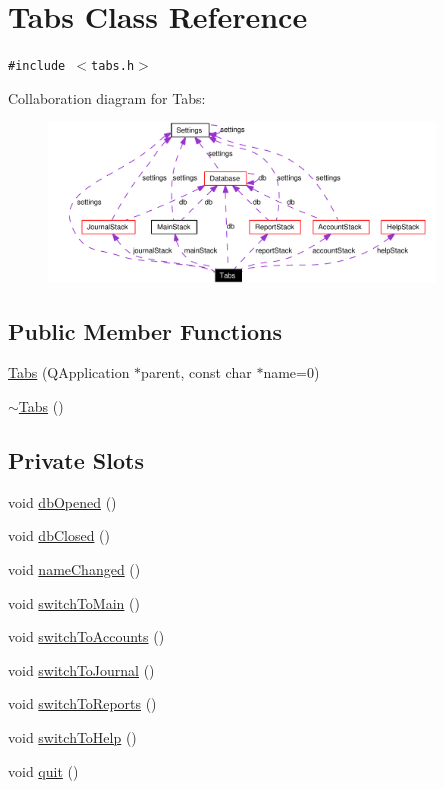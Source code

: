 \hypertarget{classTabs}{
\section{Tabs Class Reference}
\label{classTabs}
}
{\tt \#include $<$tabs.h$>$}

Collaboration diagram for Tabs:\begin{figure}[H]
\begin{center}
\leavevmode
\includegraphics[width=291pt]{classTabs__coll__graph}
\end{center}
\end{figure}
\subsection*{Public Member Functions}
\begin{CompactItemize}
\item 
\hyperlink{classTabs_a0}{Tabs} (QApplication $\ast$parent, const char $\ast$name=0)
\item 
\hyperlink{classTabs_a1}{$\sim$Tabs} ()
\end{CompactItemize}
\subsection*{Private Slots}
\begin{CompactItemize}
\item 
void \hyperlink{classTabs_k0}{db\-Opened} ()
\item 
void \hyperlink{classTabs_k1}{db\-Closed} ()
\item 
void \hyperlink{classTabs_k2}{name\-Changed} ()
\item 
void \hyperlink{classTabs_k3}{switch\-To\-Main} ()
\item 
void \hyperlink{classTabs_k4}{switch\-To\-Accounts} ()
\item 
void \hyperlink{classTabs_k5}{switch\-To\-Journal} ()
\item 
void \hyperlink{classTabs_k6}{switch\-To\-Reports} ()
\item 
void \hyperlink{classTabs_k7}{switch\-To\-Help} ()
\item 
void \hyperlink{classTabs_k8}{quit} ()
\end{CompactItemize}
